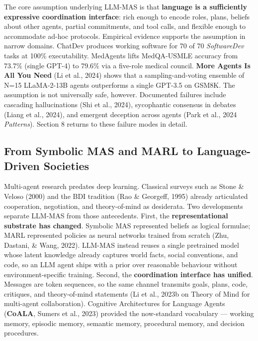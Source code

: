 The core assumption underlying LLM-MAS is that \textbf{language is a sufficiently expressive coordination interface}: rich enough to encode roles, plans, beliefs about other agents, partial commitments, and tool calls, and flexible enough to accommodate ad-hoc protocols. Empirical evidence supports the assumption in narrow domains. ChatDev produces working software for 70 of 70 \emph{SoftwareDev} tasks at 100\% executability. MedAgents lifts MedQA-USMLE accuracy from 73.7\% (single GPT-4) to 79.6\% via a five-role medical council. \textbf{More Agents Is All You Need} (Li et al., 2024) shows that a sampling-and-voting ensemble of N=15 LLaMA-2-13B agents outperforms a single GPT-3.5 on GSM8K. The assumption is not universally safe, however. Documented failures include cascading hallucinations (Shi et al., 2024), sycophantic consensus in debates (Liang et al., 2024), and emergent deception across agents (Park et al., 2024 \emph{Patterns}). Section 8 returns to these failure modes in detail.

\subsection{From Symbolic MAS and MARL to Language-Driven Societies}\label{from-symbolic-mas-and-marl-to-language-driven-societies}

Multi-agent research predates deep learning. Classical surveys such as Stone \& Veloso (2000) and the BDI tradition (Rao \& Georgeff, 1995) already articulated cooperation, negotiation, and theory-of-mind as desiderata. Two developments separate LLM-MAS from those antecedents. First, the \textbf{representational substrate has changed}. Symbolic MAS represented beliefs as logical formulae; MARL represented policies as neural networks trained from scratch (Zhu, Dastani, \& Wang, 2022). LLM-MAS instead reuses a single pretrained model whose latent knowledge already captures world facts, social conventions, and code, so an LLM agent ships with a prior over reasonable behaviour without environment-specific training. Second, the \textbf{coordination interface has unified}. Messages are token sequences, so the same channel transmits goals, plans, code, critiques, and theory-of-mind statements (Li et al., 2023b on Theory of Mind for multi-agent collaboration). Cognitive Architectures for Language Agents (\textbf{CoALA}, Sumers et al., 2023) provided the now-standard vocabulary --- working memory, episodic memory, semantic memory, procedural memory, and decision procedures.

